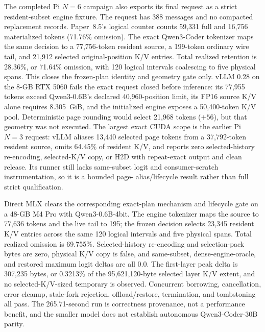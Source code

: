 \documentclass[11pt]{article}
\begin{document}
The completed Pi $N=6$ campaign also exports its final request as a strict
resident-subset engine fixture.  The request has 388 messages and no compacted
replacement records.  Paper~8.5's logical counter counts 59,331 full and
16,756 materialized tokens (71.76\% omission).  The exact Qwen3-Coder tokenizer
maps the same decision to a 77,756-token resident source, a 199-token ordinary
wire tail, and 21,912 selected original-position K/V entries.  Total realized
retention is 28.36\%, or 71.64\% omission, with 120 logical intervals
coalescing to five physical spans.  This closes the frozen-plan identity and
geometry gate only.  vLLM 0.28 on the 8-GB RTX 5060 fails the exact request
closed before inference: its 77,955 tokens exceed Qwen3-0.6B's declared
40,960-position limit, its FP16 source K/V alone requires 8.305~GiB, and the
initialized engine exposes a 50,400-token K/V pool.  Deterministic page rounding
would select 21,968 tokens ($+56$), but that geometry was not executed.  The
largest exact CUDA scope is the earlier Pi $N=3$ request: vLLM aliases 13,440
selected page tokens from a 37,792-token resident source, omits 64.45\% of
resident K/V, and reports zero selected-history re-encoding, selected-K/V copy,
or H2D with repeat-exact output and clean release.  Its runner still lacks
same-subset logit and consumer-scratch instrumentation, so it is a bounded page-
alias/lifecycle result rather than full strict qualification.

Direct MLX clears the corresponding exact-plan mechanism and lifecycle gate on
a 48-GB M4 Pro with Qwen3-0.6B-4bit.  The engine tokenizer maps the source to
77,636 tokens and the live tail to 195; the frozen decision selects 23,345
resident K/V entries across the same 120 logical intervals and five physical
spans.  Total realized omission is 69.755\%.  Selected-history re-encoding and
selection-pack bytes are zero, physical K/V copy is false, and same-subset,
dense-engine-oracle, and restored maximum logit deltas are all 0.0.  The
first-layer peak delta is 307,235 bytes, or 0.3213\% of the 95,621,120-byte
selected layer K/V extent, and no selected-K/V-sized temporary is observed.
Concurrent borrowing, cancellation, error cleanup, stale-fork rejection,
offload/restore, termination, and tombstoning all pass.  The 265.71-second run
is correctness provenance, not a performance benefit, and the smaller model
does not establish autonomous Qwen3-Coder-30B parity.
\end{document}
